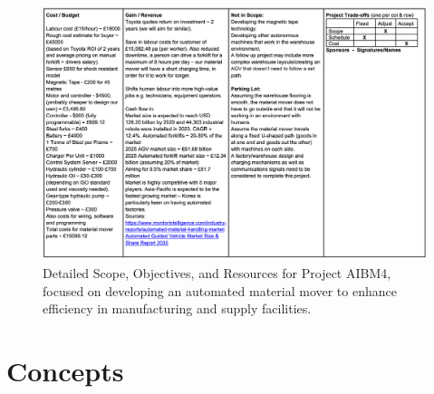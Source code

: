 \documentclass[12pt]{article}
\begin{document}
\begin{figure}[h!]
    \centering
     \includegraphics[width=1\textwidth]{scope2.png}
        \caption{Detailed Scope, Objectives, and Resources for Project AIBM4, focused on developing an automated material mover to enhance efficiency in manufacturing and supply facilities.}
         \label{fig:Project Scope Document for AIBM4}
\end{figure}



\newpage
\section{Concepts}
\end{document}
